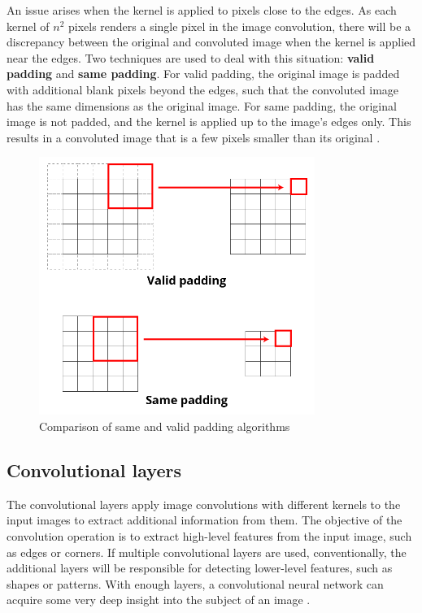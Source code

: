 ﻿\documentclass[12pt,a4paper,notitlepage]{article}
\begin{document}
An issue arises when the kernel is applied to pixels close to the edges. As each kernel of \(n^2\) pixels renders a single pixel in the image convolution, there will be a discrepancy between the original and convoluted image when the kernel is applied near the edges. Two techniques are used to deal with this situation: \textbf{valid padding} and \textbf{same padding}. For valid padding, the original image is padded with additional blank pixels beyond the edges, such that the convoluted image has the same dimensions as the original image. For same padding, the original image is not padded, and the kernel is applied up to the image's edges only. This results in a convoluted image that is a few pixels smaller than its original \cite{sanderson_convolutions_2020}.
\begin{figure}[htbp]
 \centering
  \includegraphics[width=0.80\textwidth]{images/padding-illustration.png}
 \caption{Comparison of same and valid padding algorithms}
 \label{fig:padding-illustration}
\end{figure}

\subsection{Convolutional layers}\label{cnn-section}
The convolutional layers apply image convolutions with different kernels to the input images to extract additional information from them. The objective of the convolution operation is to extract high-level features from the input image, such as edges or corners. If multiple convolutional layers are used, conventionally, the additional layers will be responsible for detecting lower-level features, such as shapes or patterns. With enough layers, a convolutional neural network can 
acquire some very deep insight into the subject of an image \cite{saha_comprehensive_2018}.
\end{document}
